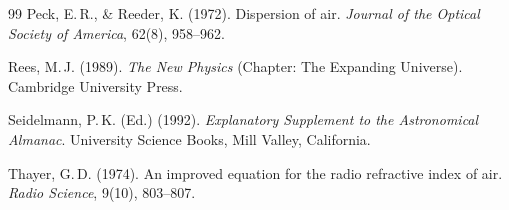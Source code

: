﻿\documentclass[12pt,a4paper]{article}
\begin{document}
\begin{thebibliography}{99}
Peck, E.\,R., \& Reeder, K. (1972).
\newblock Dispersion of air.
\newblock \textit{Journal of the Optical Society of America}, 62(8), 958--962.
\newblock {}

Rees, M.\,J. (1989).
\newblock \textit{The New Physics} (Chapter: The Expanding Universe).
\newblock Cambridge University Press.

Seidelmann, P.\,K. (Ed.) (1992).
\newblock \textit{Explanatory Supplement to the Astronomical Almanac}.
\newblock University Science Books, Mill Valley, California.

Thayer, G.\,D. (1974).
\newblock An improved equation for the radio refractive index of air.
\newblock \textit{Radio Science}, 9(10), 803--807.
\newblock {}

\end{thebibliography}
\end{document}
